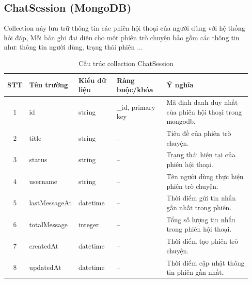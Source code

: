 \documentclass[../DoAn.tex]{subfiles}
\begin{document}
\subsection{ChatSession (MongoDB)}
Collection này lưu trữ thông tin các phiên hội thoại của người dùng với hệ thống hỏi đáp, Mỗi bản ghi đại diện cho một phiên trò chuyện bảo gồm các thông tin như: thông tin người dùng, trạng thái phiên ...
\begin{table}[htbp]
    \centering
    \small
    \renewcommand{\arraystretch}{1.6}
    \label{tab:mongodb-chat-session}
    \begin{tabularx}{\textwidth}{|c|p{3cm}|p{2.8cm}|p{3.5cm}|>{\raggedright\arraybackslash}X|}
        \hline
        \textbf{STT} & \textbf{Tên trường} & \textbf{Kiểu dữ liệu} & \textbf{Ràng buộc/khóa} & \textbf{Ý nghĩa}                                         \\
        \hline
        1            & id                  & string                & \_id, primary key       & Mã định danh duy nhất của phiên hội thoại trong mongodb. \\
        \hline
        2            & title               & string                & --                      & Tiêu đề của phiên trò chuyện.                            \\
        \hline
        3            & status              & string                & --                      & Trạng thái hiện tại của phiên hội thoại.                 \\
        \hline
        4            & username            & string                & --                      & Tên người dùng thực hiện phiên trò chuyện.               \\
        \hline
        5            & lastMessageAt       & datetime              & --                      & Thời điểm gửi tin nhắn gần nhất trong phiên.             \\
        \hline
        6            & totalMessage        & integer               & --                      & Tổng số lượng tin nhắn trong phiên hội thoại.            \\
        \hline
        7            & createdAt           & datetime              & --                      & Thời điểm tạo phiên trò chuyện.                          \\
        \hline
        8            & updatedAt           & datetime              & --                      & Thời điểm cập nhật thông tin phiên gần nhất.             \\
        \hline
    \end{tabularx}
    \caption{Cấu trúc collection ChatSession}
\end{table}
\end{document}
